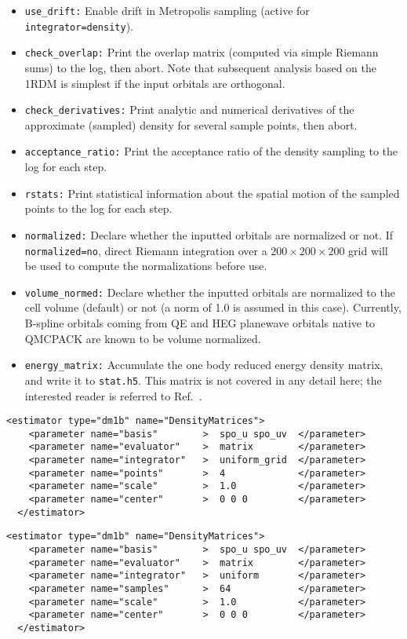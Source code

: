 \begin{itemize}
  \item{\texttt{use\_drift:} Enable drift in Metropolis sampling  (active for \texttt{integrator=density}).}
  \item{\texttt{check\_overlap:} Print the overlap matrix (computed via simple Riemann sums) to the log, then abort.  Note that subsequent analysis based on the 1RDM is simplest if the input orbitals are orthogonal.}
  \item{\texttt{check\_derivatives:} Print analytic and numerical derivatives of the approximate (sampled) density for several sample points, then abort. }
  \item{\texttt{acceptance\_ratio:} Print the acceptance ratio of the density sampling to the log for each step.}
  \item{\texttt{rstats:} Print statistical information about the spatial motion of the sampled points to the log for each step.}
  \item{\texttt{normalized:} Declare whether the inputted orbitals are normalized or not.  If \texttt{normalized=no}, direct Riemann integration over a $200 \times 200 \times 200$ grid will be used to compute the normalizations before use.}
  \item{\texttt{volume\_normed:} Declare whether the inputted orbitals are normalized to the cell volume (default) or not (a norm of 1.0 is assumed in this case).  Currently, B-spline orbitals coming from QE and HEG planewave orbitals native to QMCPACK are known to be volume normalized.}
  \item{\texttt{energy\_matrix:} Accumulate the one body reduced energy density matrix, and write it to \texttt{stat.h5}.  This matrix is not covered in any detail here; the interested reader is referred to Ref.~\cite{Krogel2014}.}
\end{itemize}


\begin{lstlisting}[style=QMCPXML,caption=One body density matrix with uniform grid integration.]
  <estimator type="dm1b" name="DensityMatrices">
    <parameter name="basis"        >  spo_u spo_uv  </parameter>
    <parameter name="evaluator"    >  matrix        </parameter>
    <parameter name="integrator"   >  uniform_grid  </parameter>
    <parameter name="points"       >  4             </parameter>
    <parameter name="scale"        >  1.0           </parameter>
    <parameter name="center"       >  0 0 0         </parameter>
  </estimator>
\end{lstlisting}


\begin{lstlisting}[style=QMCPXML,caption=One body density matrix with uniform sampling.]
  <estimator type="dm1b" name="DensityMatrices">
    <parameter name="basis"        >  spo_u spo_uv  </parameter>
    <parameter name="evaluator"    >  matrix        </parameter>
    <parameter name="integrator"   >  uniform       </parameter>
    <parameter name="samples"      >  64            </parameter>
    <parameter name="scale"        >  1.0           </parameter>
    <parameter name="center"       >  0 0 0         </parameter>
  </estimator>
\end{lstlisting}


